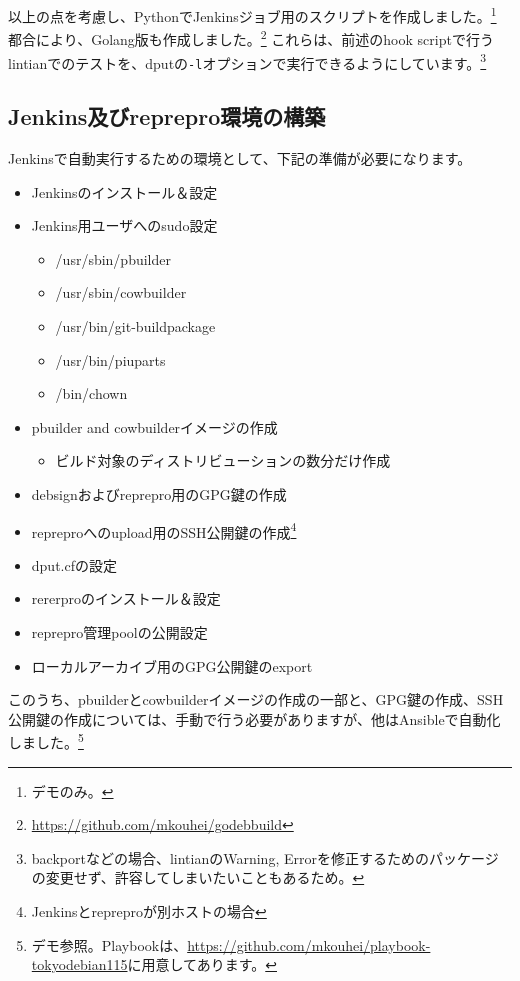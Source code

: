 \documentclass[mingoth,a4paper]{jsarticle}
\begin{document}
以上の点を考慮し、PythonでJenkinsジョブ用のスクリプトを作成しました。\footnote{デモのみ。}
都合により、Golang版も作成しました。\footnote{\url{https://github.com/mkouhei/godebbuild}}
これらは、前述のhook scriptで行うlintianでのテストを、dputの\texttt{-l}オプションで実行できるようにしています。\footnote{backportなどの場合、lintianのWarning, Errorを修正するためのパッケージの変更せず、許容してしまいたいこともあるため。}

\subsection{Jenkins及びreprepro環境の構築}

Jenkinsで自動実行するための環境として、下記の準備が必要になります。

\begin{itemize}
  \item Jenkinsのインストール＆設定
  \item Jenkins用ユーザへのsudo設定
    \begin{itemize}
      \item /usr/sbin/pbuilder
      \item /usr/sbin/cowbuilder
      \item /usr/bin/git-buildpackage
      \item /usr/bin/piuparts
      \item /bin/chown
    \end{itemize}
  \item pbuilder and cowbuilderイメージの作成
    \begin{itemize}
      \item ビルド対象のディストリビューションの数分だけ作成
    \end{itemize}
  \item debsignおよびreprepro用のGPG鍵の作成
  \item repreproへのupload用のSSH公開鍵の作成\footnote{Jenkinsとrepreproが別ホストの場合}
  \item dput.cfの設定
  \item rererproのインストール＆設定
  \item reprepro管理poolの公開設定
  \item ローカルアーカイブ用のGPG公開鍵のexport
\end{itemize}

このうち、pbuilderとcowbuilderイメージの作成の一部と、GPG鍵の作成、SSH公開鍵の作成については、手動で行う必要がありますが、他はAnsibleで自動化しました。\footnote{デモ参照。Playbookは、\url{https://github.com/mkouhei/playbook-tokyodebian115}に用意してあります。}
\end{document}
